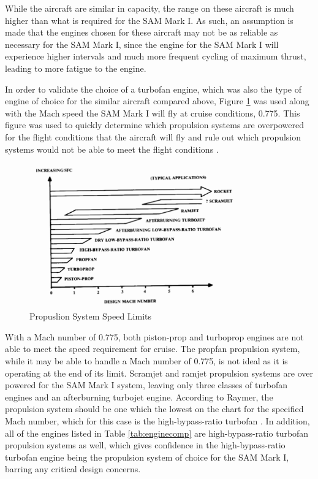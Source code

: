 While the aircraft are similar in capacity, the range on these aircraft is much higher than what is required for the SAM Mark I. As such, an assumption is made that the engines chosen for these aircraft may not be as reliable as necessary for the SAM Mark I, since the engine for the SAM Mark I will experience higher intervals and much more frequent cycling of maximum thrust, leading to more fatigue to the engine. 

In order to validate the choice of a turbofan engine, which was also the type of engine of choice for the similar aircraft compared above, Figure \ref{PropSelection} was used along with the Mach speed the SAM Mark I will fly at cruise conditions, 0.775. This figure was used to quickly determine which propulsion systems are overpowered for the flight conditions that the aircraft will fly and rule out which propulsion systems would not be able to meet the flight conditions \cite{raymer}.

\begin{figure} [h!]
    \centering
    \includegraphics[width=0.8\textwidth]{Photos/PropSelection.PNG}
    \caption{Propuslion System Speed Limits}
    \label{PropSelection}
\end{figure}

\newpage
With a Mach number of 0.775, both piston-prop and turboprop engines are not able to meet the speed requirement for cruise. The propfan propulsion system, while it may be able to handle a Mach number of 0.775, is not ideal as it is operating at the end of its limit. Scramjet and ramjet propulsion systems are over powered for the SAM Mark I system, leaving only three classes of turbofan engines and an afterburning turbojet engine. According to Raymer, the propulsion system should be one which the lowest on the chart for the specified Mach number, which for this case is the high-bypass-ratio turbofan \cite{raymer}. In addition, all of the engines listed in Table \ref{tab:enginecomp} are high-bypass-ratio turbofan propulsion systems as well, which gives confidence in the high-bypass-ratio turbofan engine being the propulsion system of choice for the SAM Mark I, barring any critical design concerns.

